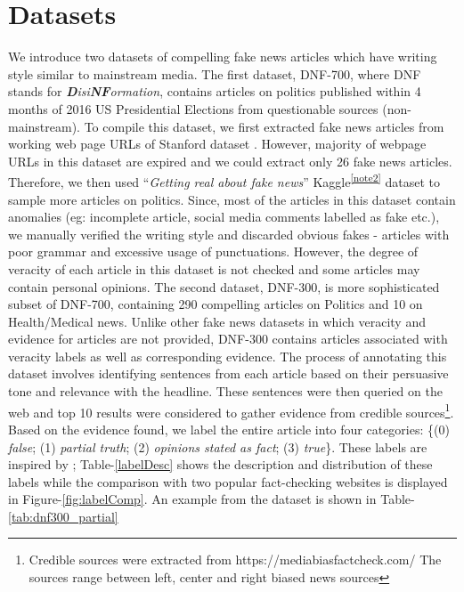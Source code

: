 \documentclass[11pt,a4paper]{article}
\begin{document}
\section{Datasets}
\label{sec:dataset}
{
We introduce two datasets of compelling fake news articles which have writing style similar to mainstream media. The first dataset, DNF-700, where DNF stands for \textit{\textbf{D}isi\textbf{NF}ormation}, contains articles on politics published within 4 months of 2016 US Presidential Elections from questionable sources (non-mainstream). To compile this dataset, we first extracted fake news articles from working web page URLs of Stanford dataset \cite{allcott2017social}. However, majority of webpage URLs in this dataset are expired and we could extract only 26 fake news articles. Therefore, we then used ``\textit{Getting real about fake news}'' Kaggle\textsuperscript{\ref{note2}} dataset to sample more articles on politics. Since, most of the articles in this dataset contain anomalies (eg: incomplete article, social media comments labelled as fake etc.), we manually verified the writing style and discarded obvious fakes - articles with poor grammar and excessive usage of punctuations. However, the degree of veracity of each article in this dataset is not checked and some articles may contain personal opinions.}\newline
{\indent The second dataset, DNF-300, is more sophisticated subset of DNF-700, containing 290 compelling articles on Politics and 10 on Health/Medical news. Unlike other fake news datasets in which veracity and evidence for articles are not provided, DNF-300 contains articles associated with veracity labels as well as corresponding evidence. The process of annotating this dataset involves identifying sentences from each article based on their persuasive tone and relevance with the headline. These sentences were then queried on the web and top 10 results were considered to gather evidence from credible sources\footnote{Credible sources were extracted from https://mediabiasfactcheck.com/ The sources range between left, center and right biased news sources}. Based on the evidence found, we label the entire article into four categories: \{(0) \textit{false}; (1) \textit{partial truth}; (2) \textit{opinions stated as fact}; (3) \textit{true}\}. These labels are inspired by \cite{pathak-srihari-2019-breaking}; Table-\ref{labelDesc} shows the description and distribution of these labels while the comparison with two popular fact-checking websites is displayed in Figure-\ref{fig:labelComp}. An example from the dataset is shown in Table-\ref{tab:dnf300_partial}}\newline
\end{document}
